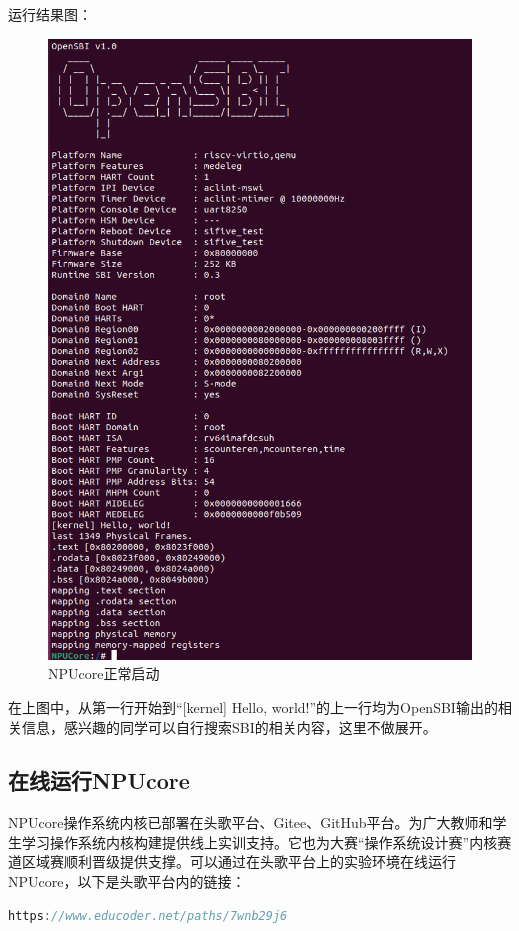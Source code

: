 		运行结果图：
		
		\begin{figure}[htb]
			\centering
			\includegraphics[width=\textwidth]{figures/02-01-NPUcore正常启动.png}
			\caption{
				NPUcore正常启动
			}
			\label{fig:NPUcore正常启动}
		\end{figure}
			在上图中，从第一行开始到“[kernel] Hello, world!”的上一行均为OpenSBI输出的相关信息，感兴趣的同学可以自行搜索SBI的相关内容，这里不做展开。
			
			\subsection{在线运行NPUcore}
			
			NPUcore操作系统内核已部署在头歌平台、Gitee、GitHub平台。为广大教师和学生学习操作系统内核构建提供线上实训支持。它也为大赛“操作系统设计赛”内核赛道区域赛顺利晋级提供支撑。可以通过在头歌平台上的实验环境在线运行NPUcore，以下是头歌平台内的链接：
			\begin{lstlisting}[language={Rust}, label={code:forktest},
				caption={NPUcore实验在头歌平台上的链接}]
				https://www.educoder.net/paths/7wnb29j6
			\end{lstlisting}
			
